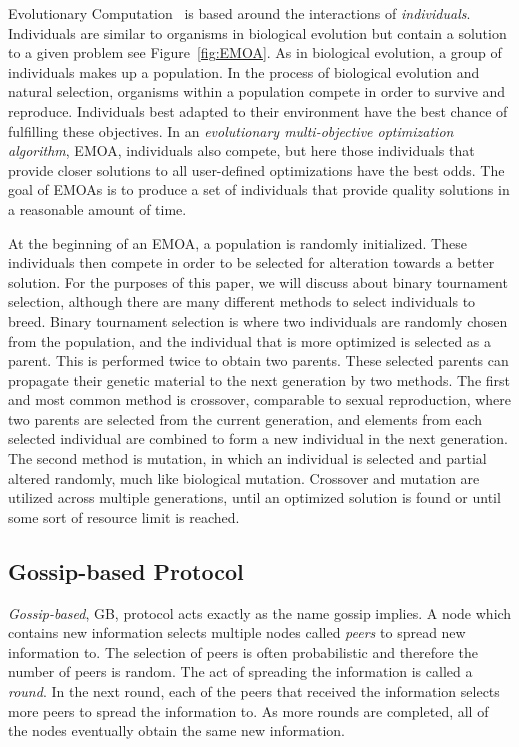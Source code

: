\documentclass{sig-alternate}
\begin{document}
Evolutionary Computation~\cite{poli08:fieldguide} is based around the interactions of \emph{individuals}. Individuals are similar to organisms in biological evolution but contain a solution to a given problem see Figure~\ref{fig:EMOA}. As in biological evolution, a group of individuals makes up a population. In the process of biological evolution and natural selection, organisms within a population compete in order to survive and reproduce. Individuals best adapted to their environment have the best chance of fulfilling these objectives.  In an \emph{evolutionary multi-objective optimization algorithm}, EMOA, individuals also compete, but here those individuals that provide closer solutions to all user-defined optimizations have the best odds. The goal of EMOAs is to produce a set of individuals that provide quality solutions in a reasonable amount of time. 

At the beginning of an EMOA, a population is randomly initialized. These individuals then compete in order to be selected for alteration towards a better solution. For the purposes of this paper, we will discuss about binary tournament selection, although there are many different methods to select individuals to breed. Binary tournament selection is where two individuals are randomly chosen from the population, and the individual that is more optimized is selected as a parent. This is performed twice to obtain two parents.  These selected parents can propagate their genetic material to the next generation by two methods. The first and most common method is crossover, comparable to sexual reproduction, where two parents are selected from the current generation, and elements from each selected individual are combined to form a new individual in the next generation. The second method is mutation, in which an individual is selected and partial altered randomly, much like biological mutation. Crossover and mutation are utilized across multiple generations, until an optimized solution is found or until some sort of resource limit is reached. %

\subsection{Gossip-based Protocol}
\label{sec:GBP}

\emph{Gossip-based}, GB, protocol acts exactly as the name gossip implies. A node which contains new information selects multiple nodes called \emph{peers} to spread new information to. The selection of peers is often probabilistic and therefore the number of peers is random. The act of spreading the information is called a \emph{round}. In the next round, each of the peers that received the information selects more peers to spread the information to. As more rounds are completed, all of the nodes eventually obtain the same new information.~\cite{Yanggratoke}
\end{document}
